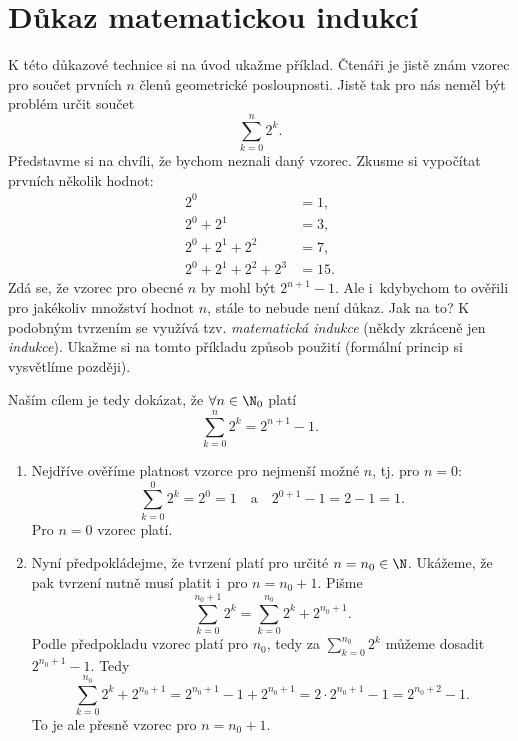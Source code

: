 \section{Důkaz matematickou indukcí}\label{sec:dukaz_indukci}
K této důkazové technice si na úvod ukažme příklad. Čtenáři je jistě znám vzorec pro součet prvních $n$ členů geometrické posloupnosti. Jistě tak pro nás neměl být problém určit součet
\begin{equation*}
    \sum_{k=0}^{n}{2^k}.
\end{equation*}
Představme si na chvíli, že bychom neznali daný vzorec. Zkusme si vypočítat prvních několik hodnot:
\begin{align*}
    2^0&=1,\\
    2^0+2^1&=3,\\
    2^0+2^1+2^2&=7,\\
    2^0+2^1+2^2+2^3&=15.
\end{align*}
Zdá se, že vzorec pro obecné $n$ by mohl být $2^{n+1}-1$. Ale i~kdybychom to ověřili pro jakékoliv množství hodnot $n$, stále to nebude není důkaz. Jak na to? K podobným tvrzením se využívá tzv. \emph{matematická indukce} (někdy zkráceně jen \emph{indukce}). Ukažme si na tomto příkladu způsob použití (formální princip si vysvětlíme později).\par
Naším cílem je tedy dokázat, že $\forall n\in\N_0$ platí
\begin{equation*}
    \sum_{k=0}^{n}{2^k}=2^{n+1}-1.
\end{equation*}
\begin{enumerate}[label=(\roman*)]
    \item\label{item:zaklad_indukce} Nejdříve ověříme platnost vzorce pro nejmenší možné $n$, tj. pro $n=0$:
    \begin{equation*}
        \sum_{k=0}^{0}{2^k}=2^0=1\quad\text{a}\quad2^{0+1}-1=2-1=1.
    \end{equation*}
    Pro $n=0$ vzorec platí.
    \item\label{item:indukcni_krok} Nyní předpokládejme, že tvrzení platí pro určité $n=n_0\in\N$. Ukážeme, že pak tvrzení nutně musí platit i~pro $n=n_0+1$. Pišme
    \begin{equation*}
        \sum_{k=0}^{n_0+1}{2^k}=\sum_{k=0}^{n_0}{2^k}+2^{n_0+1}.
    \end{equation*}
    Podle předpokladu vzorec platí pro $n_0$, tedy za $\sum_{k=0}^{n_0}{2^k}$ můžeme dosadit $2^{n_0+1}-1$. Tedy
    \begin{equation*}
        \sum_{k=0}^{n_0}{2^k}+2^{n_0+1}=2^{n_0+1}-1+2^{n_0+1}=2\cdot 2^{n_0+1}-1=2^{n_0+2}-1.
    \end{equation*}
    To je ale přesně vzorec pro $n=n_0+1$.
\end{enumerate}
